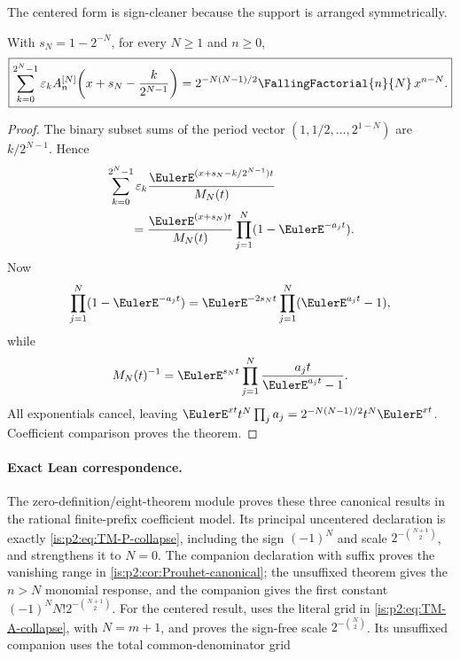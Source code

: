 The centered form is sign-cleaner because the support is arranged symmetrically.

\begin{theorem}
\label{is:p2:thm:TM-centered}
With $s_N=1-2^{-N}$, for every $N\ge1$ and $n\ge0$,
\begin{equation}
 \boxed{
 \sum_{k=0}^{2^N-1}\eps_k
 A_n^{[N]}\!\left(x+s_N-\frac{k}{2^{N-1}}\right)
 =2^{-N(N-1)/2}\FallingFactorial{n}{N}\,x^{n-N}.
 }
 \label{is:p2:eq:TM-A-collapse}
\end{equation}
\end{theorem}

\begin{proof}
The binary subset sums of the period vector
$(1,1/2,\ldots,2^{1-N})$ are $k/2^{N-1}$.  Hence
\begin{align*}
 &\sum_{k=0}^{2^N-1}\eps_k
 \frac{\EulerE^{(x+s_N-k/2^{N-1})t}}{M_N(t)}\\
 &\qquad=
 \frac{\EulerE^{(x+s_N)t}}{M_N(t)}
 \prod_{j=1}^{N}(1-\EulerE^{-a_jt}).
\end{align*}
Now
\[
 \prod_{j=1}^{N}(1-\EulerE^{-a_jt})
 =\EulerE^{-2s_Nt}\prod_{j=1}^{N}(\EulerE^{a_jt}-1),
\]
while
\[
 M_N(t)^{-1}=\EulerE^{s_Nt}\prod_{j=1}^{N}\frac{a_jt}{\EulerE^{a_jt}-1}.
\]
All exponentials cancel, leaving
$\EulerE^{xt}t^N\prod_ja_j=2^{-N(N-1)/2}t^N\EulerE^{xt}$.  Coefficient comparison proves the theorem.
\end{proof}

\paragraph{Exact Lean correspondence.}
The zero-definition/eight-theorem module
 proves these three
canonical results in the rational finite-prefix coefficient model.  Its
principal uncentered declaration
is exactly \eqref{is:p2:eq:TM-P-collapse}, including the sign
$(-1)^N$ and scale $2^{-\binom{N+1}{2}}$, and strengthens it to $N=0$.
The companion declaration with suffix  proves the vanishing
range in \cref{is:p2:cor:Prouhet-canonical}; the unsuffixed theorem gives the
$n>N$ monomial response, and the  companion gives the first
constant $(-1)^N N!2^{-\binom{N+1}{2}}$.  For the centered result,
uses the literal grid in \eqref{is:p2:eq:TM-A-collapse}, with $N=m+1$, and
proves the sign-free scale $2^{-\binom{N}{2}}$.  Its unsuffixed companion uses
the total common-denominator grid

